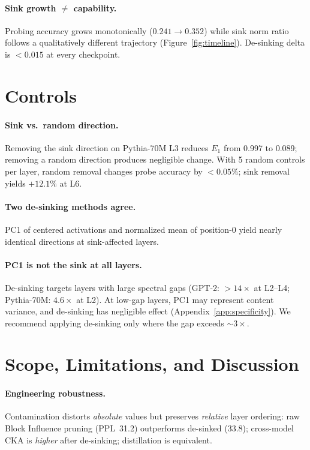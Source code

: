 \documentclass[11pt]{article}
\begin{document}
\paragraph{Sink growth $\neq$ capability.}
Probing accuracy grows monotonically ($0.241 \to 0.352$) while sink norm ratio follows a qualitatively different trajectory (Figure~\ref{fig:timeline}).
De-sinking delta is $< 0.015$ at every checkpoint.

\section{Controls}\label{sec:controls}

\paragraph{Sink vs.\ random direction.}
Removing the sink direction on Pythia-70M L3 reduces $E_1$ from 0.997 to 0.089; removing a random direction produces negligible change.
With 5 random controls per layer, random removal changes probe accuracy by $< 0.05\%$; sink removal yields $+12.1\%$ at L6.

\paragraph{Two de-sinking methods agree.}
PC1 of centered activations and normalized mean of position-0 yield nearly identical directions at sink-affected layers.

\paragraph{PC1 is not the sink at all layers.}
De-sinking targets layers with large spectral gaps (GPT-2: $>14\times$ at L2--L4; Pythia-70M: $4.6\times$ at L2).
At low-gap layers, PC1 may represent content variance, and de-sinking has negligible effect (Appendix~\ref{app:specificity}).
We recommend applying de-sinking only where the gap exceeds ${\sim}3\times$.

\section{Scope, Limitations, and Discussion}\label{sec:discussion}

\paragraph{Engineering robustness.}
Contamination distorts \emph{absolute} values but preserves \emph{relative} layer ordering: raw Block Influence pruning (PPL~31.2) outperforms de-sinked (33.8); cross-model CKA is \emph{higher} after de-sinking; distillation is equivalent.
\end{document}
